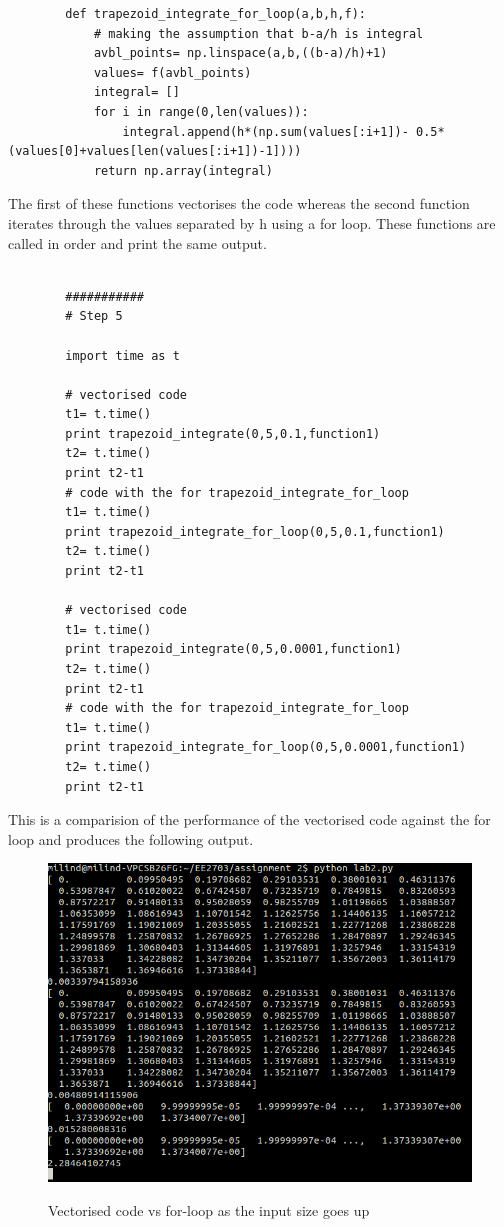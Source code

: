 \documentclass[a4paper, 12pt, margin= 1.25cm ]{article}
\begin{document}
\begin{enumerate}
\begin{lstlisting}
		def trapezoid_integrate_for_loop(a,b,h,f):
			# making the assumption that b-a/h is integral		
			avbl_points= np.linspace(a,b,((b-a)/h)+1)						
			values= f(avbl_points)
			integral= []
			for i in range(0,len(values)):
				integral.append(h*(np.sum(values[:i+1])- 0.5*(values[0]+values[len(values[:i+1])-1])))
			return np.array(integral)

		\end{lstlisting}

		The first of these functions vectorises the code whereas the second function iterates through the values separated by h using a for loop. These functions are called in order and print the same output.


		\begin{lstlisting}

		###########
		# Step 5

		import time as t

		# vectorised code
		t1= t.time()
		print trapezoid_integrate(0,5,0.1,function1)
		t2= t.time()
		print t2-t1
		# code with the for trapezoid_integrate_for_loop
		t1= t.time()
		print trapezoid_integrate_for_loop(0,5,0.1,function1)
		t2= t.time()
		print t2-t1

		# vectorised code
		t1= t.time()
		print trapezoid_integrate(0,5,0.0001,function1)
		t2= t.time()
		print t2-t1
		# code with the for trapezoid_integrate_for_loop
		t1= t.time()
		print trapezoid_integrate_for_loop(0,5,0.0001,function1)
		t2= t.time()
		print t2-t1

		\end{lstlisting}

		This is a comparision of the performance of the vectorised code against the for loop and produces the following output.

		\begin{figure}[H]
		\includegraphics[width= \linewidth]{vector.png}
		\label{fig:vector}
		\caption{Vectorised code vs for-loop as the input size goes up}
		\end{figure}


\end{enumerate}
\end{document}
